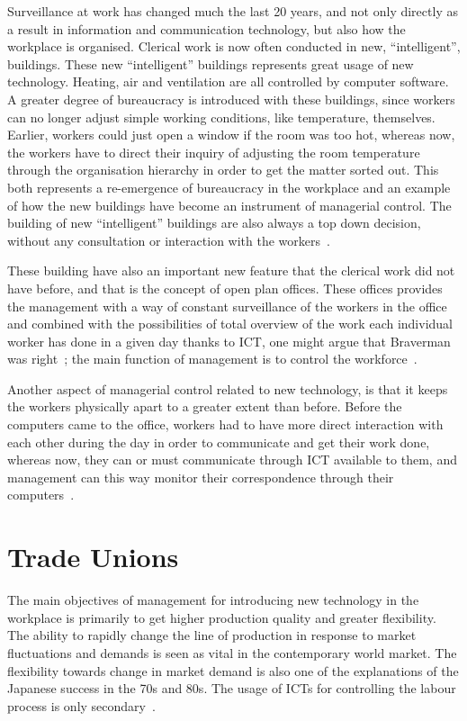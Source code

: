 \documentclass[a4paper,12pt,titlepage]{article}
\begin{document}
  Surveillance at work has changed much the last 20 years, and not
  only directly as a result in information and communication technology,
  but also how the workplace is organised. Clerical work is now
  often conducted in new, ``intelligent'', buildings.
  These new ``intelligent'' buildings represents great usage
  of new technology. Heating, air and ventilation are all
  controlled by computer software. A greater degree of bureaucracy
  is introduced with these buildings, since workers can no longer adjust
  simple working conditions, like temperature, themselves. Earlier,
  workers could just open a window if the room was too hot, whereas
  now, the workers have to direct their inquiry of adjusting the room
  temperature through the organisation hierarchy in order to
  get the matter sorted out. This both represents a re-emergence of bureaucracy
  in the workplace and an example of how the new buildings have become
  an instrument of managerial control.
  The building of new ``intelligent'' buildings are also always
  a top down decision, without any consultation or interaction
  with the workers~\cite[180-181]{bbt}.

  These building have also an important new feature that the clerical
  work did not have before, and that is the concept of open plan offices. These
  offices provides the management with a way of constant surveillance of
  the workers in the office~\cite[166]{bbt} and combined with the
  possibilities of total overview of the work each individual
  worker has done in a given day thanks to ICT, one might argue that Braverman
  was right~\cite[157]{pa}; the main function of
  management is to control the workforce~\cite[63]{hb}.

  Another aspect of managerial control related to new technology, is
  that it keeps the workers physically apart to a greater extent than before.
  Before the computers came to the office, workers had to have more direct interaction
  with each other during the day in order to communicate and get their work done, whereas
  now, they can or must communicate through ICT available to them,
  and management can this way monitor their correspondence through
  their computers~\cite[128-138]{jg}.

  \section{Trade Unions}
  The main objectives of management for introducing new technology
  in the workplace is primarily to get higher production quality and
  greater flexibility. The ability to rapidly change
  the line of production in response to market fluctuations and demands
  is seen as vital in the contemporary world market. The flexibility
  towards change in market demand is also one of the explanations
  of the Japanese success in the 70s and 80s. The usage of
  ICTs for controlling the labour process is only secondary~\cite[22-3]{bl}.
\end{document}
